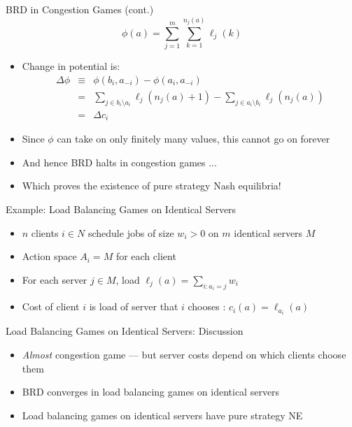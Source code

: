 \documentclass[11pt,aspectratio=169,handout]{beamer}
\begin{document}
  
  \begin{frame}{BRD in Congestion Games (cont.)}
   \[\phi(a) = \sum_{j=1}^m \sum_{k=1}^{n_j(a)} \ell_j(k)\]
   \begin{itemize}[<+->]
    \item Change in potential is:
    \begin{eqnarray*}
     \Delta\phi & \equiv & \phi(b_i, a_{-i}) - \phi(a_i, a_{-i}) \\
     & = & \sum_{j \in b_i\setminus a_i}\ell_j(n_j(a)+1) - \sum_{j \in a_i \setminus b_i}\ell_j(n_j(a)) \\
     & = & \Delta c_i
    \end{eqnarray*}
    \item Since $\phi$ can take on only finitely many values, this cannot go on forever
    \item And hence BRD halts in congestion games ...
    \item Which proves the \alert{existence} of pure strategy Nash equilibria!
   \end{itemize}
  \end{frame}
  
  
  \begin{frame}{Example: Load Balancing Games on Identical Servers}
   \begin{itemize}[<+->]
   \setlength{\itemsep}{1.5em}
    \item $n$ clients $i \in N$ schedule jobs of size $w_i > 0$ on $m$ identical servers $M$
    \item Action space $A_i = M$ for each client
    \item For each server $j \in M$, load $\ell_j(a) = \sum_{i : a_i = j}w_i$
    \item Cost of client $i$ is load of server that $i$ chooses : $c_i(a) = \ell_{a_i}(a)$
   \end{itemize}
  \end{frame}
  
  
  \begin{frame}{Load Balancing Games on Identical Servers: Discussion}
   \begin{itemize}[<+->]
   \setlength{\itemsep}{1.5em}
    \item \textit{Almost} congestion game --- but server costs depend on \alert{which} clients choose them
    \item BRD converges in load balancing games on identical servers
    \item Load balancing games on identical servers have pure strategy NE
   \end{itemize}
  \end{frame}
  
\end{document}
